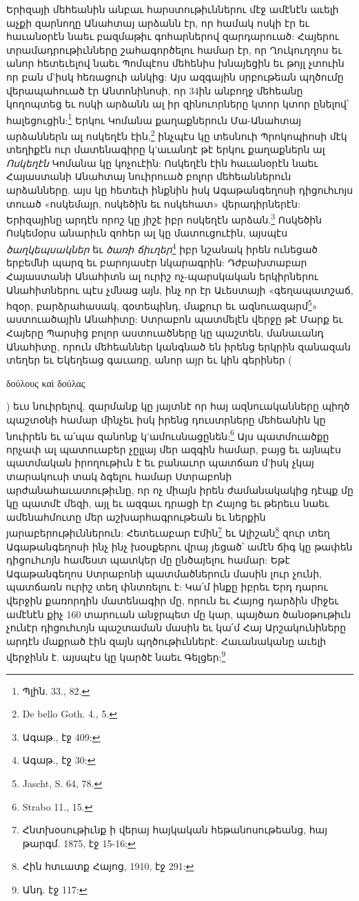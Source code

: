\documentclass{article}
\begin{document}
{Երիզայի մեհեանին անբաւ հարստութիւններու մէջ ամէնէն աւելի աչքի զարնողը Անահտայ արձանն էր, որ համակ ոսկի էր եւ հաւանօրէն նաեւ բազմաթիւ գոհարներով զարդարուած: Հայերու տրամադրութիւնները շահագործելու համար էր, որ Ղուկուղղոս եւ անոր հետեւելով նաեւ Պոմպէոս մեհենիս խնայեցին եւ թոյլ չտուին որ բան մ'իսկ հեռացուի անկից: Այս ազգային սրբութեան պղծումը վերապահուած էր Անտոնինոսի, որ 34ին անբողջ մեհեանը կողոպտեց եւ ոսկի արձանն ալ իր զինուորները կտոր կտոր ընելով՝ հալեցուցին:\footnote{Պլին. 33., 82.} Երկու Կոմանա քաղաքներուն Մա-Անահտայ արձաններն ալ ոսկեղէն էին,\footnote{De bello Goth. 4., 5.} ինչպէս կը տեսնուի Պրոկոպիոսի մէկ տեղիքէն ուր մատենագիրը կ'աւանդէ թէ երկու քաղաքներն ալ \emph{Ոսկեղէն} Կոմանա կը կոչուէին: Ոսկեղէն էին հաւանօրէն նաեւ Հայաստանի Անահտայ նուիրուած բոլոր մեհեաններուն արձանները. այս կը հետեւի ինքնին իսկ Ագաթանգեղոսի դիցուհւոյս տուած «ոսկեմայր, ոսկեծին եւ ոսկեհատ» վերադիրներէն: Երիզայինը արդէն որոշ կը յիշէ իբր ոսկեղէն արձան.\footnote{Ագաթ., էջ 409:} Ոսկեծին Ոսկեմօրս անարիւն զոհեր ալ կը մատուցուէին, այսպէս \emph{ծաղկեպսակներ} եւ \emph{ծառի ճիւղեր}\footnote{Ագաթ., էջ 30:} իբր նշանակ իրեն ունեցած երբեմնի պարզ եւ բարոյասէր նկարագրին: Դժբախտաբար Հայաստանի Անահիտն ալ ուրիշ ոչ-պարսկական երկիրներու Անահիտներու պէս չմնաց այն, ինչ որ էր Աւեստայի «գեղապատշաճ, հզօր, բարձրահասակ, գօտեպինդ, մաքուր եւ ազնուազարմ\footnote{Jascht, S. 64, 78.}» աստուածային Անահիտը: Ստրաբոն պատմելէն վերջը թէ Մարք եւ Հայերը Պարսից բոլոր աստուածները կը պաշտեն, մանաւանդ Անահիտը, որուն մեհեաններ կանգնած են իրենց երկրին զանազան տեղեր եւ Եկեղեաց գաւառը, անոր այր եւ կին գերիներ (\begin{greek}δούλους καὶ δούλας\end{greek}) եւս նուիրելով, զարմանք կը յայտնէ որ հայ ազնուականները պիղծ պաշտօնի համար մինչեւ իսկ իրենց դուստրները մեհեանին կը նուիրեն եւ ա՛պա զանոնք կ'ամուսնացընեն:\footnote{Strabo 11., 15.} Այս պատմուածքը որչափ ալ պատուաբեր չըլլայ մեր ազգին համար, բայց եւ այնպէս պատմական իրողութիւն է եւ բանաւոր պատճառ մ'իսկ չկայ տարակուսի տակ ձգելու համար Ստրաբոնի արժանահաւատութիւնը, որ ոչ միայն իրեն ժամանակակից դէպք մը կը պատմէ մեզի, այլ եւ ազգաւ դրացի էր Հայոց եւ թերեւս նաեւ ամենահմուտը մեր աշխարհագրութեան եւ ներքին յարաբերութիւններուն: Հետեւաբար Էմին\footnote{Հնտխօսութիւնք ի վերայ հայկական հեթանոսութեանց, հայ թարգմ. 1875, էջ 15-16:} եւ Ալիշան\footnote{Հին հտւատք Հայոց, 1910, էջ 291:} զուր տեղ Ագաթանգեղոսի ինչ ինչ խօսքերու վրայ յեցած՝ ամէն ճիգ կը թափեն դիցուհւոյն համեստ պատկեր մը ընծայելու համար: Եթէ Ագաթանգեղոս Ստրաբոնի պատմածներուն մասին լուր չունի, պատճառն ուրիշ տեղ փնտռելու է: Կա՛մ ինքը իբրեւ Երդ դարու վերջին քառորդին մատենագիր մը, որուն եւ Հայոց դարձին միջեւ ամէնէն քիչ 160 տարուան անջրպետ մը կար, պայծառ ծանօթութիւն չունէր դիցուհւոյն պաշտաման մասին եւ կա՛մ Հայ Արշակունիները արդէն մաքրած էին զայն պղծութիւններէ: Հաւանականը աւելի վերջինն է. այսպէս կը կարծէ նաեւ Գելցեր:\footnote{Անդ. էջ 117:}

}
\end{document}
